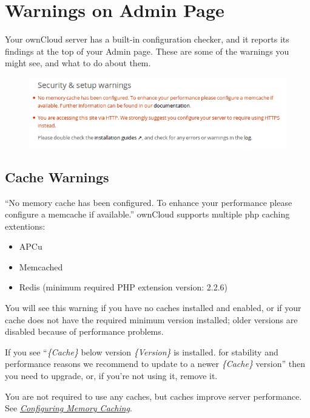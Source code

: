 \documentclass[letterpaper,10pt,english]{sphinxmanual}
\begin{document}
\section{Warnings on Admin Page}
\label{configuration_server/security_setup_warnings::doc}\label{configuration_server/security_setup_warnings:warnings-on-admin-page}
Your ownCloud server has a built-in configuration checker, and it reports its
findings at the top of your Admin page. These are some of the warnings you
might see, and what to do about them.
\begin{figure}[htbp]
\centering

\includegraphics{security-setup-warning-1.png}
\end{figure}


\subsection{Cache Warnings}
\label{configuration_server/security_setup_warnings:cache-warnings}
``No memory cache has been configured. To enhance your performance please
configure a memcache if available.'' ownCloud supports multiple php caching
extentions:
\begin{itemize}
\item {} 
APCu

\item {} 
Memcached

\item {} 
Redis (minimum required PHP extension version: 2.2.6)

\end{itemize}

You will see this warning if you have no caches installed and enabled, or if
your cache does not have the required minimum version installed; older versions
are disabled because of performance problems.

If you see ``\emph{\{Cache\}} below version \emph{\{Version\}} is installed. for stability and
performance reasons we recommend to update to a newer \emph{\{Cache\}} version'' then
you need to upgrade, or, if you're not using it, remove it.

You are not required to use any caches, but caches improve server performance.
See {\hyperref[configuration_server/caching_configuration::doc]{\emph{Configuring Memory Caching}}}.
\end{document}
